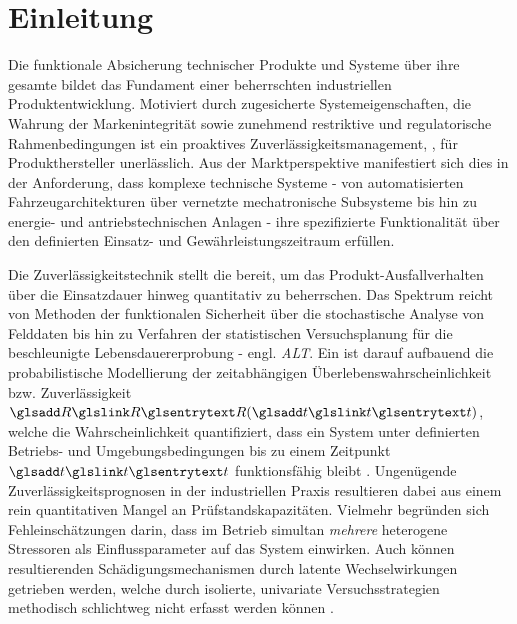 
\chapter{Einleitung} \label{chap:einleitung}

Die funktionale Absicherung technischer Produkte und Systeme über ihre gesamte  bildet das Fundament einer beherrschten industriellen Produktentwicklung.
Motiviert durch zugesicherte Systemeigenschaften, die Wahrung der Markenintegrität sowie zunehmend restriktive und regulatorische Rahmenbedingungen ist ein proaktives Zuverlässigkeitsmanagement, , für Produkthersteller unerlässlich.
Aus der Marktperspektive manifestiert sich dies in der Anforderung, dass komplexe technische Systeme - von automatisierten Fahrzeugarchitekturen über vernetzte mechatronische Subsysteme bis hin zu energie- und antriebstechnischen Anlagen - ihre spezifizierte Funktionalität über den definierten Einsatz- und Gewährleistungszeitraum  erfüllen.

Die Zuverlässigkeitstechnik stellt die  bereit, um das Produkt-Ausfallverhalten über die Einsatzdauer hinweg quantitativ zu beherrschen.
Das Spektrum reicht von  Methoden der funktionalen Sicherheit über die stochastische Analyse von Felddaten bis hin zu Verfahren der statistischen Versuchsplanung für die beschleunigte Lebensdauererprobung - engl. \textit{\ac{ALT}}.
Ein  ist darauf aufbauend die probabilistische Modellierung der zeitabhängigen Überlebenswahrscheinlichkeit bzw. Zuverlässigkeit $\sym{R}(\sym{t})$, welche die Wahrscheinlichkeit quantifiziert, dass ein System unter definierten Betriebs- und Umgebungsbedingungen bis zu einem Zeitpunkt $\sym{t}$ funktionsfähig bleibt \cite{Bertsche.2022}.
Ungenügende Zuverlässigkeitsprognosen in der industriellen Praxis resultieren dabei  aus einem rein quantitativen Mangel an Prüfstandskapazitäten.
Vielmehr begründen sich Fehleinschätzungen  darin, dass im Betrieb simultan \textit{mehrere} heterogene Stressoren als Einflussparameter auf das System einwirken.
Auch können resultierenden Schädigungsmechanismen durch latente Wechselwirkungen getrieben werden, welche durch isolierte, univariate Versuchsstrategien methodisch schlichtweg nicht erfasst werden können \cite{Meeker.2022, Rigdon.2022}.

